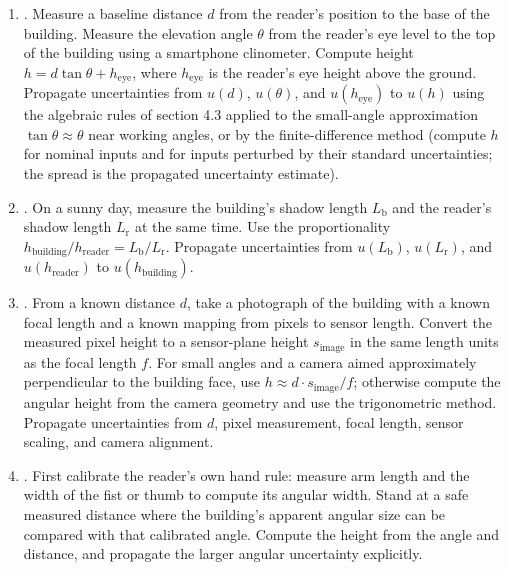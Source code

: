 \begin{project}
\begin{enumerate}[leftmargin=*]
  \item {}. Measure a baseline distance
    $d$ from the reader's position to the base of the building.
    Measure the elevation angle $\theta$ from the reader's eye level
    to the top of the building using a smartphone clinometer.
    Compute height $h = d \tan\theta + h_{\text{eye}}$, where
    $h_{\text{eye}}$ is the reader's eye height above the ground.
    Propagate uncertainties from $u(d)$, $u(\theta)$, and
    $u(h_{\text{eye}})$ to $u(h)$ using the algebraic rules of
    section 4.3 applied to the small-angle approximation
    $\tan\theta \approx \theta$ near working angles, or by the
    finite-difference method (compute $h$ for nominal inputs and for
    inputs perturbed by their standard uncertainties; the spread is
    the propagated uncertainty estimate).
  \item {}. On a sunny day, measure the
    building's shadow length $L_{\text{b}}$ and the reader's shadow
    length $L_{\text{r}}$ at the same time. Use the proportionality
    $h_{\text{building}} / h_{\text{reader}} = L_{\text{b}} /
    L_{\text{r}}$. Propagate uncertainties from $u(L_{\text{b}})$,
    $u(L_{\text{r}})$, and $u(h_{\text{reader}})$ to
    $u(h_{\text{building}})$.
  \item {}. From a known distance $d$,
    take a photograph of the building with a known focal length and
    a known mapping from pixels to sensor length. Convert the
    measured pixel height to a sensor-plane height $s_{\text{image}}$
    in the same length units as the focal length $f$. For small
    angles and a camera aimed approximately perpendicular to the
    building face, use $h \approx d \cdot s_{\text{image}} / f$;
    otherwise compute the angular height from the camera geometry
    and use the trigonometric method. Propagate uncertainties from
    $d$, pixel measurement, focal length, sensor scaling, and camera
    alignment.
  \item {}. First calibrate the reader's own
    hand rule: measure arm length and the width of the fist or
    thumb to compute its angular width. Stand at a safe measured
    distance where the building's apparent angular size can be
    compared with that calibrated angle. Compute the height from the
    angle and distance, and propagate the larger angular uncertainty
    explicitly.
\end{enumerate}


\end{project}
